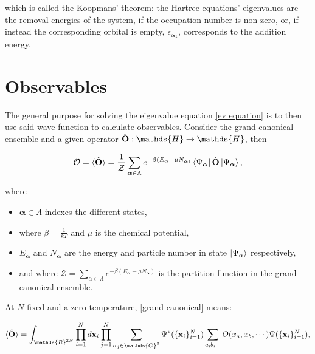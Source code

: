 \documentclass{homework}
\begin{document}
which is called the Koopmans' theorem: the Hartree equations' eigenvalues are the removal energies of the system, if the occupation number is non-zero, or, if instead the corresponding orbital is empty, $\epsilon_{{\bm \alpha}_k}$, corresponds to the addition energy. \\ 

\clearpage

\section{Observables}

The general purpose for solving the eigenvalue equation \eqref{ev equation} is to then use said wave-function to calculate observables. Consider the grand canonical ensemble and a given operator $\hat{\bf O} : \mathds{H} \rightarrow \mathds{H}$, then 

\begin{equation}
\mathcal{O} = \langle \hat{\bf O} \rangle = \frac{1}{\mathcal{Z}} \sum_{\bm{\alpha }\in \Lambda} e^{-\beta(E_{\bm{\alpha} }- \mu N_{\bm{\alpha})}} \bra{\Psi_{\bm{\alpha}}}\hat{\bf O}\ket{\Psi_{\bm{\alpha}}},
\label{grand canonical}
\end{equation}

where 

\begin{itemize}
    \item $\bm \alpha \in {\Lambda}$ indexes the different states, 
    \item where $\beta = \frac{1}{kT}$ and $\mu$ is the chemical potential,
    \item $E_{\bm{\alpha}}$ and $N_{\bm{\alpha}}$ are the energy and particle number in state $\ket{\Psi_\alpha}$ respectively,
    \item and where $\mathcal{Z} =  \sum_{\alpha \in \Lambda} e^{-\beta(E_{\bm \alpha} - \mu N_{\bm \alpha})}$ is the partition function in the grand canonical ensemble. 
\end{itemize}


At $N$ fixed and a zero temperature, \eqref{grand canonical} means:

\begin{equation}
     \langle \hat{\bf O} \rangle = \int_{\mathds{R}^{3N}} \prod_{i=1}^N d{\bf x}_i \prod_{j=1}^{N} \sum_{\sigma_j \in \mathds{C}^2} \Psi^{*}(\{{\bf x}_i\}_{i=1}^{N}) \sum_{a,b,\cdots} O(x_a, x_b, \cdots) \Psi(\{{\bf x}_i\}_{i=1}^{N}),
\label{ensemble avg}
\end{equation}
\end{document}
